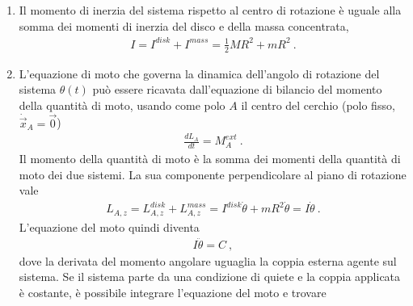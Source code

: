 \documentclass[letterpaper,10pt,italian]{jupyterBook}
\begin{document}
\sphinxAtStartPar
{}
\begin{enumerate}
%
\item {} 
\sphinxAtStartPar
Il momento di inerzia del sistema rispetto al centro di rotazione è uguale alla somma dei momenti di inerzia del disco e della massa concentrata,    
\begin{equation*}
\begin{split}I = I^{disk} + I^{mass} = \frac{1}{2} M R^2 + m R^2 \ .\end{split}
\end{equation*}
\item {} 
\sphinxAtStartPar
L’equazione di moto che governa la dinamica dell’angolo di rotazione del sistema \(\theta(t)\) può essere ricavata dall’equazione di bilancio del momento della quantità di moto, usando come polo \(A\) il centro del cerchio (polo fisso, \(\dot{\vec{x}}_A = \vec{0}\))
\begin{equation*}
\begin{split}\frac{d L_A}{d t} = M^{ext}_A \ .\end{split}
\end{equation*}
\sphinxAtStartPar
Il momento della quantità di moto è la somma dei momenti della quantità di moto dei due sistemi. La sua componente perpendicolare al piano di rotazione vale
\begin{equation*}
\begin{split}L_{A,z} = L_{A,z}^{disk} + L_{A,z}^{mass} = I^{disk} \dot{\theta} + m R^2 \dot{\theta} = I \dot{\theta} \ .\end{split}
\end{equation*}
\sphinxAtStartPar
L’equazione del moto quindi diventa
\begin{equation*}
\begin{split}I \ddot{\theta} = C \ ,\end{split}
\end{equation*}
\sphinxAtStartPar
dove la derivata del momento angolare uguaglia la coppia esterna agente sul sistema. Se il sistema parte da una condizione di quiete e la coppia applicata è costante, è possibile integrare l’equazione del moto e trovare
\begin{equation*}
\begin{split}\begin{aligned}

\end{aligned}
\end{split}
\end{equation*}
\end{enumerate}
\end{document}
